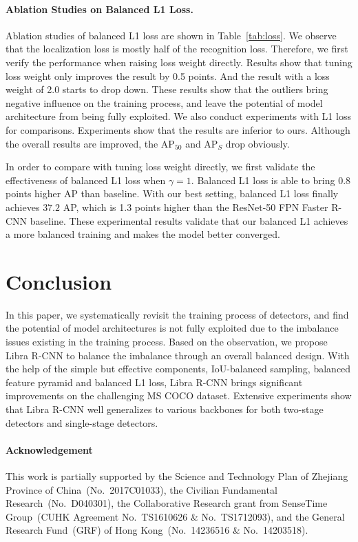 \documentclass[10pt,twocolumn,letterpaper]{article}
\begin{document}
\vspace{-12pt}
\paragraph{Ablation Studies on Balanced L1 Loss.}
Ablation studies of balanced L1 loss are shown in Table~\ref{tab:loss}.
We observe that the localization loss is mostly half of the recognition loss.
Therefore, we first verify the performance when raising loss weight directly.
Results show that tuning loss weight only improves the result by 0.5 points.
And the result with a loss weight of 2.0 starts to drop down.
These results show that the outliers bring negative influence on the training process, and leave the potential of model architecture from being fully exploited.
We also conduct experiments with L1 loss for comparisons.
Experiments show that the results are inferior to ours.
Although the overall results are improved, the AP$_{50}$ and AP$_S$ drop obviously.

In order to compare with tuning loss weight directly, we first validate the effectiveness of balanced L1 loss when $\gamma = 1$.
Balanced L1 loss is able to bring 0.8 points higher AP than baseline.
With our best setting, balanced L1 loss finally achieves $37.2$ AP, which is 1.3 points higher than the ResNet-50 FPN Faster R-CNN baseline.
These experimental results validate that our balanced L1 achieves a more balanced training and makes the model better converged.
 

\section{Conclusion}
In this paper, we systematically revisit the training process of detectors,
and find the potential of model architectures is not fully exploited due to the imbalance issues existing in the training process.
Based on the observation, we propose Libra R-CNN to balance the imbalance through an overall balanced design.
With the help of the simple but effective components, \ie IoU-balanced sampling, balanced feature pyramid and balanced L1 loss, Libra R-CNN brings significant improvements on the challenging MS COCO dataset.
Extensive experiments show that Libra R-CNN well generalizes to various backbones for both two-stage detectors and single-stage detectors.

\vspace{-10pt}
\paragraph{Acknowledgement}
This work is partially supported by
the Science and Technology Plan of Zhejiang Province of China~(No.~2017C01033),
the Civilian Fundamental Research~(No.~D040301),
the Collaborative Research grant from SenseTime Group~(CUHK Agreement No.~TS1610626 \& No.~TS1712093),
and the General Research Fund~(GRF) of Hong Kong~(No.~14236516 \& No.~14203518).
 
{\small


}
\end{document}
